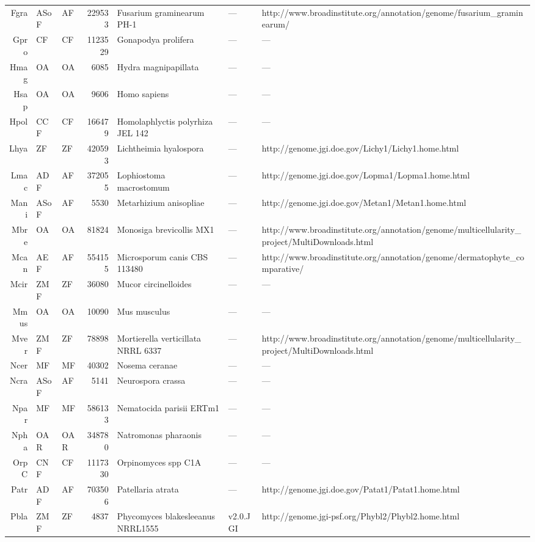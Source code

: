\begin{table}[tbp]
\begin{tabular}{rllrlll}
  Fgra & ASoF & AF & 229533 & Fusarium graminearum PH-1 & --- & http://www.broadinstitute.org/annotation/genome/fusarium\_graminearum/ \\ 
  Gpro & CF & CF & 1123529 & Gonapodya prolifera & --- & --- \\ 
  Hmag & OA & OA & 6085 & Hydra magnipapillata & --- & --- \\ 
  Hsap & OA & OA & 9606 & Homo sapiens & --- & --- \\ 
  Hpol & CCF & CF & 166479 & Homolaphlyctis polyrhiza JEL 142 & --- & --- \\ 
  Lhya & ZF & ZF & 420593 & Lichtheimia hyalospora & --- & http://genome.jgi.doe.gov/Lichy1/Lichy1.home.html \\ 
  Lmac & ADF & AF & 372055 & Lophiostoma macrostomum & --- & http://genome.jgi.doe.gov/Lopma1/Lopma1.home.html \\ 
  Mani & ASoF & AF & 5530 & Metarhizium anisopliae & --- & http://genome.jgi.doe.gov/Metan1/Metan1.home.html \\ 
  Mbre & OA & OA & 81824 & Monosiga brevicollis MX1 & --- & http://www.broadinstitute.org/annotation/genome/multicellularity\_project/MultiDownloads.html \\ 
  Mcan & AEF & AF & 554155 & Microsporum canis CBS 113480 & --- & http://www.broadinstitute.org/annotation/genome/dermatophyte\_comparative/ \\ 
  Mcir & ZMF & ZF & 36080 & Mucor circinelloides & --- & --- \\ 
  Mmus & OA & OA & 10090 & Mus musculus & --- & --- \\ 
  Mver & ZMF & ZF & 78898 & Mortierella verticillata NRRL 6337 & --- & http://www.broadinstitute.org/annotation/genome/multicellularity\_project/MultiDownloads.html \\ 
  Ncer & MF & MF & 40302 & Nosema ceranae & --- & --- \\ 
  Ncra & ASoF & AF & 5141 & Neurospora crassa & --- & --- \\ 
  Npar & MF & MF & 586133 & Nematocida parisii ERTm1 & --- & --- \\ 
  Npha & OAR & OAR & 348780 & Natromonas pharaonis & --- & --- \\ 
  OrpC & CNF & CF & 1117330 & Orpinomyces spp C1A & --- & --- \\ 
  Patr & ADF & AF & 703506 & Patellaria atrata & --- & http://genome.jgi.doe.gov/Patat1/Patat1.home.html \\ 
  Pbla & ZMF & ZF & 4837 & Phycomyces blakesleeanus NRRL1555 & v2.0.JGI & http://genome.jgi-psf.org/Phybl2/Phybl2.home.html \\ 

\end{tabular}
\end{table}
